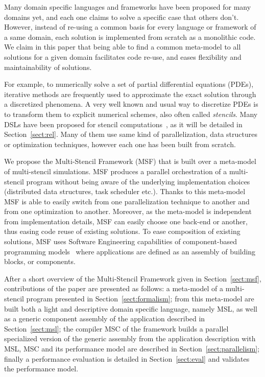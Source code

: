 Many domain specific languages and frameworks have been proposed for many domains yet, and each one claims to solve a specific case that others don't. However, instead of re-using a common basis for every language or framework of a same domain, each solution is implemented from scratch as a monolithic code. We claim in this paper that being able to find a common meta-model to all solutions for a given domain facilitates code re-use, and eases flexibility and maintainability of solutions. 

For example, to numerically solve a set of partial differential equations (PDEs), iterative methods are frequently used to approximate the exact solution through a discretized phenomena. A very well known and usual way to discretize PDEs is to transform them to explicit numerical schemes, also often called \emph{stencils}. Many DSLs have been proposed for stencil computations~\cite{spaaTangCKLL11,citeulike12258902,Ragan-Kelley:2013:HLC:2491956.2462176,DeVito:2011:LDS:2063384.2063396,Camier:2015:IPP:2820083.2820107}, as it will be detailed in Section~\ref{sect:rel}. Many of them use same kind of parallelization, data structures or optimization techniques, however each one has been built from scratch. 

We propose the Multi-Stencil Framework (MSF) that is built over a meta-model of multi-stencil simulations. MSF produces a parallel orchestration of a multi-stencil program without being aware of the underlying implementation choices (\eg distributed data structures, task scheduler etc.). Thanks to this meta-model MSF is able to easily switch from one parallelization technique to another and from one optimization to another. Moreover, as the meta-model is independent from implementation details, MSF can easily choose one back-end or another, thus easing code reuse of existing solutions. To ease composition of existing solutions, MSF uses Software Engineering capabilities of component-based programming models~\cite{Szyperski:2002:CSB:515228} where applications are defined as an assembly of building blocks, or components.

After a short overview of the Multi-Stencil Framework given in Section~\ref{sect:msf}, contributions of the paper are presented as follows: a meta-model of a multi-stencil program presented in Section~\ref{sect:formalism}; from this meta-model are built both a light and descriptive domain specific language, namely MSL, as well as a generic component assembly of the application described in Section~\ref{sect:msl}; the compiler MSC of the framework builds a parallel specialized version of the generic assembly from the application description with MSL, MSC and its performance model are described in Section~\ref{sect:parallelism}; finally a performance evaluation is detailed in Section~\ref{sect:eval}  and validates the performance model.

